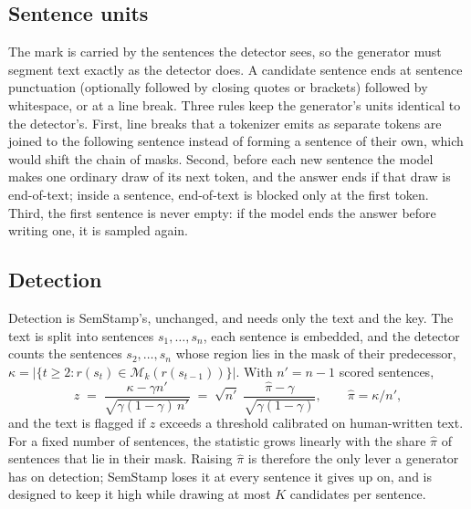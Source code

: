 \subsection{Sentence units}
\label{sec:units}

The mark is carried by the sentences the detector sees, so the generator must segment text exactly as the detector does.
A candidate sentence ends at sentence punctuation (optionally followed by closing quotes or brackets) followed by
whitespace, or at a line break. Three rules keep the generator's units identical to the detector's. First, line breaks
that a tokenizer emits as separate tokens are joined to the following sentence instead of forming a sentence of their
own, which would shift the chain of masks. Second, before each new sentence the model makes one ordinary draw of its next
token, and the answer ends if that draw is end-of-text; inside a sentence, end-of-text is blocked only at the first token.
Third, the first sentence is never empty: if the model ends the answer before writing one, it is sampled again.

\subsection{Detection}
\label{sec:detection}

Detection is SemStamp's, unchanged, and needs only the text and the key. The text is split into sentences
$s_1, \dots, s_n$, each sentence is embedded, and the detector counts the sentences $s_2, \dots, s_n$ whose region lies in
the mask of their predecessor, $\kappa = |\{ t \ge 2 : r(s_t) \in \mathcal{M}_k(r(s_{t-1})) \}|$. With $n' = n - 1$
scored sentences,
\begin{equation}
  z \;=\; \frac{\kappa - \gamma n'}{\sqrt{\gamma (1 - \gamma)\, n'}}
  \;=\; \sqrt{n'} \; \frac{\hat\pi - \gamma}{\sqrt{\gamma (1 - \gamma)}} ,
  \qquad \hat\pi = \kappa / n' ,
  \label{eq:z}
\end{equation}
and the text is flagged if $z$ exceeds a threshold calibrated on human-written text. For a fixed number of sentences,
the statistic grows linearly with the share $\hat\pi$ of sentences that lie in their mask. Raising $\hat\pi$ is
therefore the only lever a generator has on detection; SemStamp loses it at every sentence it gives up on, and \ours{}
is designed to keep it high while drawing at most $K$ candidates per sentence.
